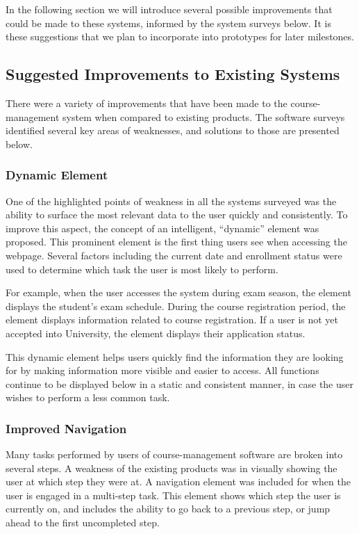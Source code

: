 \documentclass[10pt]{article}
\begin{document}
\begin{multicols}{2}
In the following section we will introduce several possible improvements that 
could be made to these systems, informed by the system surveys below. It is 
these suggestions that we plan to incorporate into prototypes for later 
milestones.

\subsection*{Suggested Improvements to Existing Systems}
There were a variety of improvements that have been made to the course-management 
system when compared to existing products. The software surveys identified 
several key areas of weaknesses, and solutions to those are presented below.

\subsubsection*{Dynamic Element}
One of the highlighted points of weakness in all the systems surveyed was the 
ability to surface the most relevant data to the user quickly and consistently. 
To improve this aspect, the concept of an intelligent, ``dynamic'' element was 
proposed. This prominent element is the first thing users see when 
accessing the webpage. Several factors including the current date and enrollment 
status were used to determine which task the user is most likely to perform.

For example, when the user accesses the system during exam season, the element 
 displays the student's exam schedule. During the course registration period, 
the element displays information related to course registration. If a user 
is not yet accepted into University, the element displays their application 
status.

This dynamic element helps users quickly find the information they are 
looking for by making information more visible and easier to access. All functions continue to be 
displayed below in a static and consistent manner, in case the user wishes to perform a less common task.

\subsubsection*{Improved Navigation}
Many tasks performed by users of course-management software are broken into 
several steps. A weakness of the existing products was in visually showing the 
user at which step they were at. A navigation element was included for when the user is engaged in a multi-step task.
This element shows which step the user is currently on, and includes the ability to 
go back to a previous step, or jump ahead to the first uncompleted step.


\end{multicols}
\end{document}
